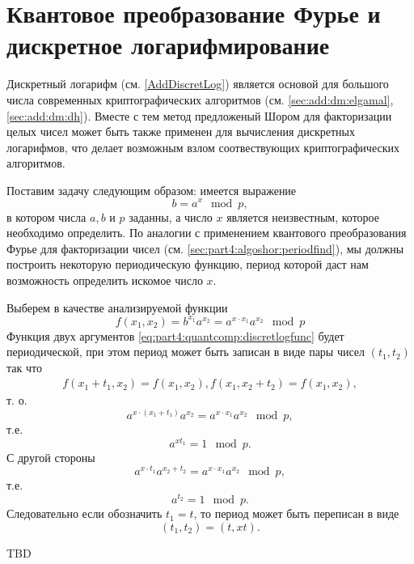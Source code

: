 \section{Квантовое преобразование Фурье и дискретное логарифмирование}
Дискретный логарифм (см. \autoref{AddDiscretLog}) является основой для
большого числа современных криптографических алгоритмов (см.
\autoref{sec:add:dm:elgamal}, \autoref{sec:add:dm:dh}). Вместе с тем 
метод предложеный Шором для факторизации целых чисел может быть также
применен для вычисления дискретных логарифмов, что делает возможным
взлом соотвествующих криптографических алгоритмов.

Поставим задачу следующим образом: имеется выражение 
\[
b = a^x \mod p,
\]
в котором числа $a, b$ и $p$ заданны, а число $x$ является
неизвестным, которое необходимо определить. По аналогии с применением
квантового преобразования Фурье для факторизации чисел (см.
\autoref{sec:part4:algoshor:periodfind}), мы должны
построить некоторую периодическую функцию, период которой даст нам
возможность определить искомое число $x$.

Выберем в качестве анализируемой функции
\begin{equation}
f\left(x_1, x_2\right) = b^{x_1}a^{x_2} = a^{x \cdot x_1} a^{x_2} \mod p
\label{eq:part4:quantcomp:discretlogfunc}
\end{equation}
Функция двух аргументов \eqref{eq:part4:quantcomp:discretlogfunc}
будет периодической, при этом период может быть записан в виде пары
чисел $(t_1, t_2)$ так что
\begin{eqnarray}
f\left(x_1 + t_1, x_2\right) = f\left(x_1, x_2\right),
f\left(x_1, x_2 + t_2\right) = f\left(x_1, x_2\right),
\end{eqnarray}
т. о. 
\[
a^{x \cdot \left( x_1 + t_1 \right)} a^{x_2} = a^{x \cdot x_1} a^{x_2}
\mod p,
\]
т.е. 
\[
a^{x t_1} = 1 \mod p.
\]
С другой стороны
\[
a^{x \cdot t_1} a^{x_2 + t_2} = a^{x \cdot x_1} a^{x_2}
\mod p,
\]
т.е.
\[
a^{t_2} = 1 \mod p.
\]
Следовательно если обозначить $t_1 = t$, то период может быть
переписан в виде
\[
(t_1, t_2) = (t, x t).
\]



TBD

